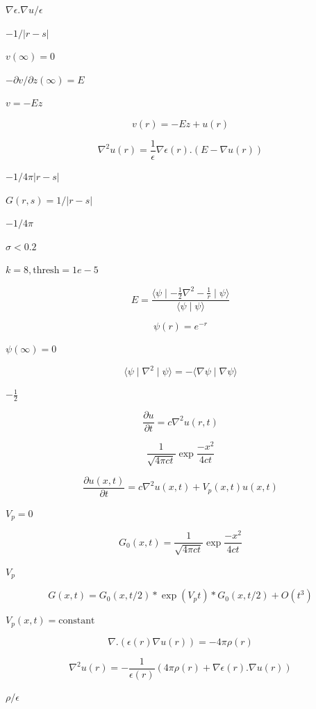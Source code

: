\documentclass{article}
\begin{document}
$\nabla \epsilon . \nabla u / \epsilon$
\pagebreak

$-1 / |r-s|$
\pagebreak

$v(\infty)=0$
\pagebreak

$- \partial v / \partial z(\infty) = E$
\pagebreak

$v = - E z$
\pagebreak

\[
v(r) = - E z + u(r)
\]
\pagebreak

\[
   \nabla^2 u(r) = \frac{1}{\epsilon} \nabla \epsilon(r) .  \left(E - \nabla u(r) \right)
\]
\pagebreak

$-1 / 4 \pi |r-s|$
\pagebreak

$G(r,s) = 1/|r-s|$
\pagebreak

$-1/4\pi$
\pagebreak

$\sigma<0.2$
\pagebreak

$k=8, \mbox{thresh}=1e-5$
\pagebreak

\[
    E = \frac{\langle \psi \mid - \frac{1}{2}  \nabla^2  - \frac{1}{r} \mid \psi \rangle}{\langle \psi \mid \psi \rangle}
\]
\pagebreak

\[
   \psi(r) = e^{-r}
\]
\pagebreak

$ \psi(\infty)=0 $
\pagebreak

\[
     \langle \psi \mid \nabla^2 \mid \psi \rangle = - \langle \nabla \psi \mid \nabla \psi \rangle
\]
\pagebreak

$-\frac{1}{2}$
\pagebreak

\[
\frac{\partial u}{\partial t} = c \nabla^2 u(r,t)
\]
\pagebreak

\[
\frac{1}{\sqrt{4 \pi c t}}  \exp \frac{-x^2}{4 c t}
\]
\pagebreak

\[
  \frac{\partial u(x,t)}{\partial t} = c \nabla^2 u(x,t) + V_p(x,t) u(x,t)
\]
\pagebreak

$ V_p = 0 $
\pagebreak

\[
  G_0(x,t) = \frac{1}{\sqrt{4 \pi c t}} \exp \frac{-x^2}{4 c t}
\]
\pagebreak

$ V_p $
\pagebreak

\[
  G(x,t) = G_0(x,t/2) * \exp(V_p t) * G_0(x,t/2) + O(t^3)
\]
\pagebreak

$ V_p(x,t)=\mbox{constant} $
\pagebreak

\[
\nabla . \left( \epsilon(r) \nabla u(r)  \right) = - 4 \pi \rho(r)
\]
\pagebreak

\[
   \nabla^2 u(r) = - \frac{1}{\epsilon(r)} \left( 4 \pi \rho(r) + \nabla \epsilon(r) .  \nabla u(r) \right)
\]
\pagebreak

$\rho / \epsilon$
\pagebreak
\end{document}
